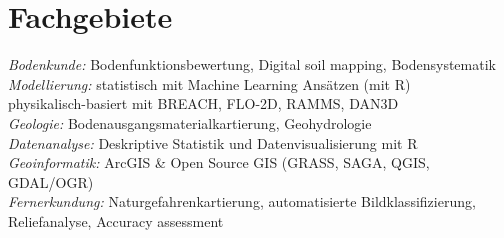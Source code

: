 \documentclass[a4paper]{twentysecondcv} %
\begin{document}

\aboutme{} %







\makeprofile %




\section{Fachgebiete}

\emph{Bodenkunde:} Bodenfunktionsbewertung, Digital soil mapping, Bodensystematik\\[0.3em]
\emph{Modellierung:} statistisch mit Machine Learning Ans\"atzen (mit R)\\
\hspace*{6em}           physikalisch-basiert mit BREACH, FLO-2D, RAMMS, DAN3D\\[0.3em]
\emph{Geologie:} Bodenausgangsmaterialkartierung, Geohydrologie\\[0.3em]
\emph{Datenanalyse:} Deskriptive Statistik und Datenvisualisierung mit R\\[0.3em]
\emph{Geoinformatik: }ArcGIS \& Open Source GIS (GRASS, SAGA, QGIS, GDAL/OGR)\\[0.3em]
\emph{Fernerkundung:} Naturgefahrenkartierung, automatisierte Bildklassifizierung,\\
\hspace*{7em}   Reliefanalyse, Accuracy assessment\\[0.3em]
\end{document}

